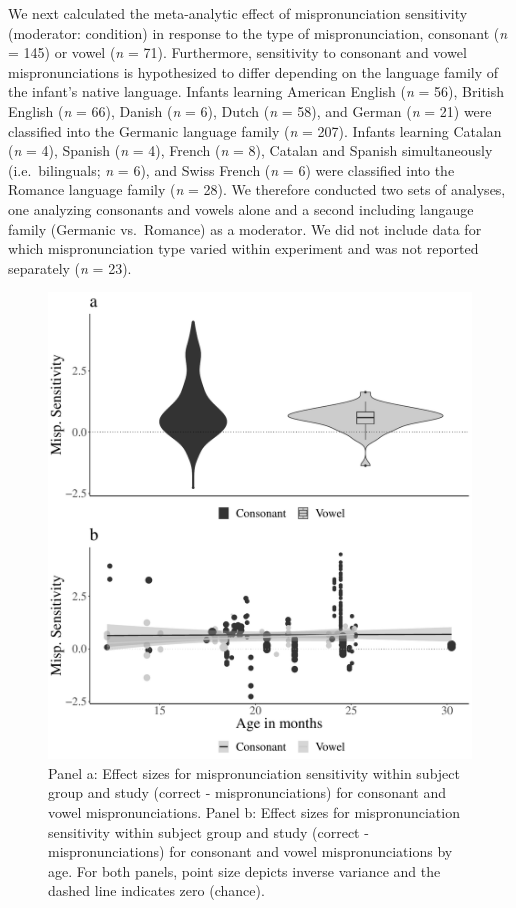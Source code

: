 \documentclass[
  man, noextraspace]{apa6}
\begin{document}
We next calculated the meta-analytic effect of mispronunciation sensitivity (moderator: condition) in response to the type of mispronunciation, consonant (\emph{n} = 145) or vowel (\emph{n} = 71). Furthermore, sensitivity to consonant and vowel mispronunciations is hypothesized to differ depending on the language family of the infant's native language. Infants learning American English (\emph{n} = 56), British English (\emph{n} = 66), Danish (\emph{n} = 6), Dutch (\emph{n} = 58), and German (\emph{n} = 21) were classified into the Germanic language family (\emph{n} = 207). Infants learning Catalan (\emph{n} = 4), Spanish (\emph{n} = 4), French (\emph{n} = 8), Catalan and Spanish simultaneously (i.e.~bilinguals; \emph{n} = 6), and Swiss French (\emph{n} = 6) were classified into the Romance language family (\emph{n} = 28). We therefore conducted two sets of analyses, one analyzing consonants and vowels alone and a second including langauge family (Germanic vs.~Romance) as a moderator. We did not include data for which mispronunciation type varied within experiment and was not reported separately (\emph{n} = 23).

\begin{figure}
\centering
\includegraphics{VonHolzenBergmann_MPMetaAnalysis_files/figure-latex/PlotMispType-1.pdf}
\caption{\label{fig:PlotMispType}Panel a: Effect sizes for mispronunciation sensitivity within subject group and study (correct - mispronunciations) for consonant and vowel mispronunciations. Panel b: Effect sizes for mispronunciation sensitivity within subject group and study (correct - mispronunciations) for consonant and vowel mispronunciations by age. For both panels, point size depicts inverse variance and the dashed line indicates zero (chance).}
\end{figure}
\end{document}
